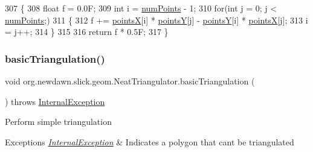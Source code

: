 \begin{DoxyCode}
307     \{
308         \textcolor{keywordtype}{float} f = 0.0F;
309         \textcolor{keywordtype}{int} i = \mbox{\hyperlink{classorg_1_1newdawn_1_1slick_1_1geom_1_1_neat_triangulator_a24b4a230bc11d3c96dfe1de4dcb297f5}{numPoints}} - 1;
310         \textcolor{keywordflow}{for}(\textcolor{keywordtype}{int} j = 0; j < \mbox{\hyperlink{classorg_1_1newdawn_1_1slick_1_1geom_1_1_neat_triangulator_a24b4a230bc11d3c96dfe1de4dcb297f5}{numPoints}};)
311         \{
312             f += \mbox{\hyperlink{classorg_1_1newdawn_1_1slick_1_1geom_1_1_neat_triangulator_a651e2f489c027306dacf8b03fb0f04a0}{pointsX}}[i] * \mbox{\hyperlink{classorg_1_1newdawn_1_1slick_1_1geom_1_1_neat_triangulator_ac4491217b5be9c7a1ccbdb5511f832d9}{pointsY}}[j] - \mbox{\hyperlink{classorg_1_1newdawn_1_1slick_1_1geom_1_1_neat_triangulator_ac4491217b5be9c7a1ccbdb5511f832d9}{pointsY}}[i] * 
      \mbox{\hyperlink{classorg_1_1newdawn_1_1slick_1_1geom_1_1_neat_triangulator_a651e2f489c027306dacf8b03fb0f04a0}{pointsX}}[j];
313             i = j++;
314         \}
315 
316         \textcolor{keywordflow}{return} f * 0.5F;
317     \}
\end{DoxyCode}
\mbox{\label{classorg_1_1newdawn_1_1slick_1_1geom_1_1_neat_triangulator_ab1c1949c138da4b2c29a47c5326059e0}} 
\subsubsection{\texorpdfstring{basic\+Triangulation()}{basicTriangulation()}}
{\footnotesize\ttfamily void org.\+newdawn.\+slick.\+geom.\+Neat\+Triangulator.\+basic\+Triangulation (\begin{DoxyParamCaption}{ }\end{DoxyParamCaption}) throws \mbox{\hyperlink{classorg_1_1newdawn_1_1slick_1_1geom_1_1_neat_triangulator_1_1_internal_exception}{Internal\+Exception}}\hspace{0.3cm}{\ttfamily [inline]}}

Perform simple triangulation


\begin{DoxyExceptions}{Exceptions}
{\em \mbox{\hyperlink{classorg_1_1newdawn_1_1slick_1_1geom_1_1_neat_triangulator_1_1_internal_exception}{Internal\+Exception}}} & Indicates a polygon that can\textquotesingle{}t be triangulated \\
\hline
\end{DoxyExceptions}

